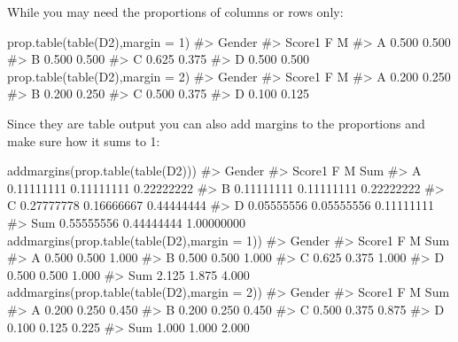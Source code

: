 \documentclass[
  letterpaper,
  DIV=11,
  numbers=noendperiod]{scrreprt}
\newenvironment{Shaded}{\begin{snugshade}}{\end{snugshade}}
\newcommand{\AttributeTok}[1]{\textcolor[rgb]{0.40,0.45,0.13}{#1}}
\newcommand{\CommentTok}[1]{\textcolor[rgb]{0.37,0.37,0.37}{#1}}
\newcommand{\DecValTok}[1]{\textcolor[rgb]{0.68,0.00,0.00}{#1}}
\newcommand{\FunctionTok}[1]{\textcolor[rgb]{0.28,0.35,0.67}{#1}}
\newcommand{\NormalTok}[1]{\textcolor[rgb]{0.00,0.23,0.31}{#1}}
\begin{document}
While you may need the proportions of columns or rows only:

\begin{Shaded}
\begin{Highlighting}[]
\FunctionTok{prop.table}\NormalTok{(}\FunctionTok{table}\NormalTok{(D2),}\AttributeTok{margin =} \DecValTok{1}\NormalTok{)}
\CommentTok{\#\textgreater{}       Gender}
\CommentTok{\#\textgreater{} Score1     F     M}
\CommentTok{\#\textgreater{}      A 0.500 0.500}
\CommentTok{\#\textgreater{}      B 0.500 0.500}
\CommentTok{\#\textgreater{}      C 0.625 0.375}
\CommentTok{\#\textgreater{}      D 0.500 0.500}
\FunctionTok{prop.table}\NormalTok{(}\FunctionTok{table}\NormalTok{(D2),}\AttributeTok{margin =} \DecValTok{2}\NormalTok{)}
\CommentTok{\#\textgreater{}       Gender}
\CommentTok{\#\textgreater{} Score1     F     M}
\CommentTok{\#\textgreater{}      A 0.200 0.250}
\CommentTok{\#\textgreater{}      B 0.200 0.250}
\CommentTok{\#\textgreater{}      C 0.500 0.375}
\CommentTok{\#\textgreater{}      D 0.100 0.125}
\end{Highlighting}
\end{Shaded}

Since they are table output you can also add margins to the proportions
and make sure how it sums to 1:

\begin{Shaded}
\begin{Highlighting}[]
\FunctionTok{addmargins}\NormalTok{(}\FunctionTok{prop.table}\NormalTok{(}\FunctionTok{table}\NormalTok{(D2)))}
\CommentTok{\#\textgreater{}       Gender}
\CommentTok{\#\textgreater{} Score1          F          M        Sum}
\CommentTok{\#\textgreater{}    A   0.11111111 0.11111111 0.22222222}
\CommentTok{\#\textgreater{}    B   0.11111111 0.11111111 0.22222222}
\CommentTok{\#\textgreater{}    C   0.27777778 0.16666667 0.44444444}
\CommentTok{\#\textgreater{}    D   0.05555556 0.05555556 0.11111111}
\CommentTok{\#\textgreater{}    Sum 0.55555556 0.44444444 1.00000000}
\FunctionTok{addmargins}\NormalTok{(}\FunctionTok{prop.table}\NormalTok{(}\FunctionTok{table}\NormalTok{(D2),}\AttributeTok{margin =} \DecValTok{1}\NormalTok{))}
\CommentTok{\#\textgreater{}       Gender}
\CommentTok{\#\textgreater{} Score1     F     M   Sum}
\CommentTok{\#\textgreater{}    A   0.500 0.500 1.000}
\CommentTok{\#\textgreater{}    B   0.500 0.500 1.000}
\CommentTok{\#\textgreater{}    C   0.625 0.375 1.000}
\CommentTok{\#\textgreater{}    D   0.500 0.500 1.000}
\CommentTok{\#\textgreater{}    Sum 2.125 1.875 4.000}
\FunctionTok{addmargins}\NormalTok{(}\FunctionTok{prop.table}\NormalTok{(}\FunctionTok{table}\NormalTok{(D2),}\AttributeTok{margin =} \DecValTok{2}\NormalTok{))}
\CommentTok{\#\textgreater{}       Gender}
\CommentTok{\#\textgreater{} Score1     F     M   Sum}
\CommentTok{\#\textgreater{}    A   0.200 0.250 0.450}
\CommentTok{\#\textgreater{}    B   0.200 0.250 0.450}
\CommentTok{\#\textgreater{}    C   0.500 0.375 0.875}
\CommentTok{\#\textgreater{}    D   0.100 0.125 0.225}
\CommentTok{\#\textgreater{}    Sum 1.000 1.000 2.000}
\end{Highlighting}
\end{Shaded}
\end{document}

